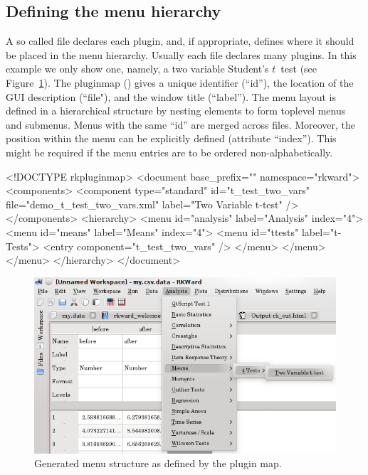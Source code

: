 \documentclass[article,shortnames]{jss}
\begin{document}
\subsection{Defining the menu hierarchy}
\label{sec:defining_menu_hierarchy}
A so called  file declares each plugin, and, if appropriate, defines where it should
be placed in the menu hierarchy. Usually each  file declares many plugins. In this example
we only show one, namely, a two variable Student's $t$~test (see Figure~\ref{fig:ttest-gui-example}). 
The pluginmap () gives a unique identifier (``id''), the location of the
GUI description (``file"), and the window title (``label''). The menu layout is defined in a hierarchical
structure by nesting  elements to form toplevel menus and submenus. Menus with the same ``id''
are merged across  files. Moreover, the position within the menu can be explicitly defined (attribute ``index'').
This might be required if the menu entries are to be ordered non-alphabetically.

\begin{footnotesize}
\begin{Code}
<!DOCTYPE rkpluginmap>
<document base_prefix="" namespace="rkward">
  <components>
    <component type="standard" id="t_test_two_vars"
          file="demo_t_test_two_vars.xml" label="Two Variable t-test" />
  </components>
  <hierarchy>
    <menu id="analysis" label="Analysis" index="4">
      <menu id="means" label="Means" index="4">
        <menu id="ttests" label="t-Tests">
          <entry component="t_test_two_vars" />
        </menu>
      </menu>
    </menu>
  </hierarchy>
</document>
\end{Code}
\end{footnotesize}


\begin{figure}[t!]
 \centering
 \includegraphics{ttest-gui-example.png}
 \caption{Generated menu structure as defined by the plugin map.}
 \label{fig:ttest-gui-example}
\end{figure}
\end{document}
